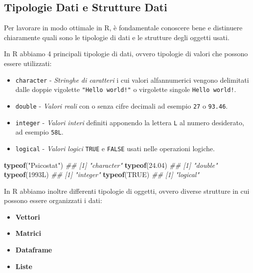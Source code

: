 \documentclass[
]{book}
\newenvironment{Shaded}{\begin{snugshade}}{\end{snugshade}}
\newcommand{\CommentTok}[1]{\textcolor[rgb]{0.56,0.35,0.01}{\textit{#1}}}
\newcommand{\FloatTok}[1]{\textcolor[rgb]{0.00,0.00,0.81}{#1}}
\newcommand{\KeywordTok}[1]{\textcolor[rgb]{0.13,0.29,0.53}{\textbf{#1}}}
\newcommand{\NormalTok}[1]{#1}
\newcommand{\OtherTok}[1]{\textcolor[rgb]{0.56,0.35,0.01}{#1}}
\newcommand{\StringTok}[1]{\textcolor[rgb]{0.31,0.60,0.02}{#1}}
\providecommand{\tightlist}{%
  \setlength{\itemsep}{0pt}\setlength{\parskip}{0pt}}
\begin{document}
\hypertarget{tipologie-dati-e-strutture-dati}{%
\subsection{Tipologie Dati e Strutture Dati}\label{tipologie-dati-e-strutture-dati}}

Per lavorare in modo ottimale in R, è fondamentale conoscere bene e distinuere chiaramente quali sono le tipologie di dati e le strutture degli oggetti usati.

In R abbiamo 4 principali tipologie di dati, ovvero tipologie di valori che possono essere utilizzati:

\begin{itemize}
\tightlist
\item
  \texttt{character} - \emph{Stringhe di caratteri} i cui valori alfannumerici vengono delimitati dalle doppie vigolette \texttt{"Hello\ world!"} o virgolette singole \texttt{\textquotesingle{}Hello\ world!\textquotesingle{}}.
\item
  \texttt{double} - \emph{Valori reali} con o senza cifre decimali ad esempio \texttt{27} o \texttt{93.46}.
\item
  \texttt{integer} - \emph{Valori interi} definiti apponendo la lettera \texttt{L} al numero desiderato, ad esempio \texttt{58L}.
\item
  \texttt{logical} - \emph{Valori logici} \texttt{TRUE} e \texttt{FALSE} usati nelle operazioni logiche.
\end{itemize}

\begin{Shaded}
\begin{Highlighting}[]
\KeywordTok{typeof}\NormalTok{(}\StringTok{"Psicostat"}\NormalTok{)}
\CommentTok{## [1] "character"}
\KeywordTok{typeof}\NormalTok{(}\FloatTok{24.04}\NormalTok{)}
\CommentTok{## [1] "double"}
\KeywordTok{typeof}\NormalTok{(1993L)}
\CommentTok{## [1] "integer"}
\KeywordTok{typeof}\NormalTok{(}\OtherTok{TRUE}\NormalTok{)}
\CommentTok{## [1] "logical"}
\end{Highlighting}
\end{Shaded}

In R abbiamo inoltre differenti tipologie di oggetti, ovvero diverse strutture in cui possono essere organizzati i dati:

\begin{itemize}
\tightlist
\item
  \textbf{Vettori}
\item
  \textbf{Matrici}
\item
  \textbf{Dataframe}
\item
  \textbf{Liste}
\end{itemize}
\end{document}

